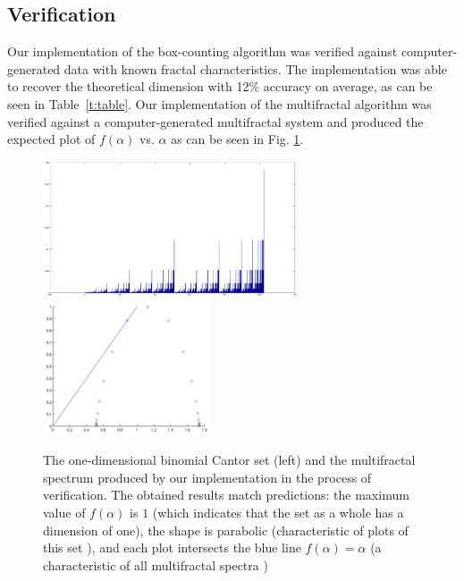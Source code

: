 \documentclass[iop]{emulateapj}
\begin{document}
\subsection{Verification}\label{Verification}

Our implementation of the box-counting algorithm was verified against computer-generated data with known fractal characteristics. The implementation was able to recover the theoretical dimension with 12\% accuracy on average, as can be seen in Table~\ref{t:table}. Our implementation of the multifractal algorithm was verified against a computer-generated multifractal system and produced the expected plot of $f(\alpha)$ vs. $\alpha$ as can be seen in Fig. \ref{f:cantorset}. 

\begin{figure}[ht]
	\begin{center}
	\includegraphics[height=4cm,clip=true]{Graphics/binomialcantor1024.png}%
	\includegraphics[height=4cm,clip=true]{Graphics/firstf(a)plot!.png}%
	\end{center}
	\caption{The one-dimensional binomial Cantor set (left) and the multifractal spectrum produced by our implementation in the process of verification. The obtained results match predictions: the maximum value of $f(\alpha)$ is $1$ (which indicates that the set as a whole has a dimension of one), the shape is parabolic (characteristic of plots of this set \citep{Chhabra1989}), and each plot intersects the blue line $f(\alpha) = \alpha$ (a characteristic of all multifractal spectra \citep{mandelbrotmultifractal})}
	\label{f:cantorset}
	\end{figure}
\end{document}
